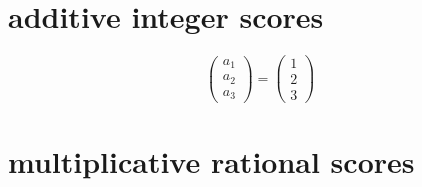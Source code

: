 \documentclass{article}
\begin{document}

\section*{additive integer scores}



\begin{equation*}
\begin{pmatrix*}
a_1 \\
a_2 \\
a_3
\end{pmatrix*}
=
\begin{pmatrix*}
1 \\
2 \\
3
\end{pmatrix*}
\end{equation*}


\section*{multiplicative rational scores}

\end{document}
